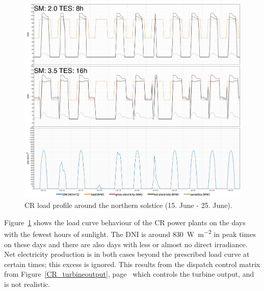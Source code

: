\begin{figure}[htbp]  
\centering
\includegraphics[width=1\linewidth]{FIG/CR_winter_load}
\caption[CR load profile around the northern solstice.]{CR load profile around the northern solstice (15. June - 25. June).}\label{CR_winter_load}
\end{figure}
Figure~\ref{CR_winter_load} shows the load curve behaviour of the CR power plants on the days with the fewest hours of sunlight. The DNI is around \SI{830}{\watt\per\square\metre} in peak times on these days and there are also days with less or almost no direct irradiance. Net electricity production is in both cases beyond the prescribed load curve at certain times; this excess is ignored. This results from the dispatch control matrix from Figure~\ref{CR_turbineoutput}, page~\pageref{CR_turbineoutput} which controls the turbine output, and is not realistic.


